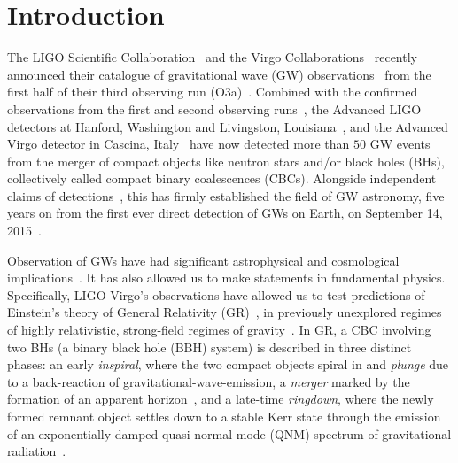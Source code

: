 \documentclass[twocolumn,prd,superscriptaddress,amsfonts,amssymb,amsmath,preprintnumbers]{revtex4-1}
\begin{document}
\maketitle


\section{Introduction}\label{sec:intro}

The LIGO Scientific Collaboration~\citep{lsc} and the Virgo Collaborations~\citep{Virgo} recently announced their catalogue of gravitational wave (GW) observations~\citep{GWTC-2} from the first half of their third observing run (O3a)~\citep{O3reference}. Combined with the confirmed observations from the first and second observing runs~\citep{abbott2019gwtc}, the Advanced LIGO detectors at Hanford, Washington and Livingston, Louisiana~\citep{aasi2015characterization}, and the Advanced Virgo detector in Cascina, Italy~\citep{acernese2014advanced} have now detected more than $50$ GW events from the merger of compact objects like neutron stars and/or black holes (BHs), collectively called compact binary coalescences (CBCs). Alongside independent claims of detections~\citep{nitz20191,nitz20202,2019PhRvD.100b3007Z,2020PhRvD.101h3030V,Venumadhav_2020}, this has firmly established the field of GW astronomy, five years on from the first ever direct detection of GWs on Earth, on September 14, 2015~\citep{abbott2016observation}.
\par
Observation of GWs have had significant astrophysical and cosmological implications~\citep{LSC_2016astroph,gw170817_mma,gw170817_joint,gw170817_hubble}. It has also allowed us to make statements in fundamental physics. Specifically, LIGO-Virgo's observations have allowed us to test predictions of Einstein's theory of General Relativity (GR)~\citep[GR]{}, in previously unexplored regimes of highly relativistic, strong-field regimes of gravity~\citep{LSC_2016grtests,GW170817_TGR,gwtc1_tgr}. In GR, a CBC involving two BHs (a binary black hole (BBH) system) is described in three distinct phases: an early \textit{inspiral}, where the two compact objects spiral in and \textit{plunge} due to a back-reaction of gravitational-wave-emission, a \textit{merger} marked by the formation of an apparent horizon~\citep{NRpaper}, and a late-time \textit{ringdown}, where the newly formed remnant object settles down to a stable Kerr state through the emission of an exponentially damped quasi-normal-mode (QNM) spectrum of gravitational radiation~\citep{vishu,earlyqnmpapers}.  
\end{document}

